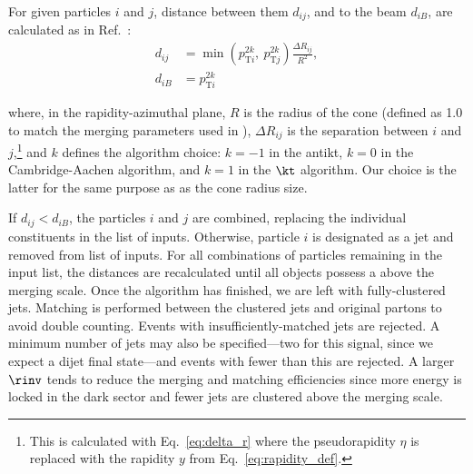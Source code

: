 For given particles $i$ and $j$, distance between them $d_{ij}$, and to the beam $d_{iB}$, are calculated as in Ref.~:
\begin{equation}
    \begin{aligned}
d_{ij} &= \min(p_{\mathrm{T}i}^{2k}, \ p_{\mathrm{T}j}^{2k}) \frac{\Delta R_{ij}}{R^2},\\
d_{iB} &= p_{\mathrm{T}i}^{2k}
    \end{aligned}
    \label{eq:distances_kt_pythia}
\end{equation}

where, in the rapidity-azimuthal plane, $R$ is the radius of the cone (defined as 1.0 to match the merging parameters used in \MADGRAPH), $\Delta R_{ij}$ is the separation between $i$ and $j$,\footnote{This is calculated with Eq.~\ref{eq:delta_r} where the pseudorapidity $\eta$ is replaced with the rapidity $y$ from Eq.~\ref{eq:rapidity_def}.} and $k$ defines the algorithm choice: $k = -\text{1}$ in the \gls{antikt}, $k = \text{0}$ in the Cambridge-Aachen algorithm, and $k = \text{1}$ in the $\kt$ algorithm. Our choice is the latter for the same purpose as as the cone radius size.

If $d_{ij} < d_{iB}$, the particles $i$ and $j$ are combined, replacing the individual constituents in the list of inputs. Otherwise, particle $i$ is designated as a jet and removed from list of inputs. For all combinations of particles remaining in the input list, the distances are recalculated until all objects possess a \pt above the merging scale. Once the algorithm has finished, we are left with fully-clustered \glspl{jet}. Matching is performed between the clustered jets and original partons to avoid double counting. Events with insufficiently-matched jets are rejected. A minimum number of \glspl{jet} may also be specified---two for this signal, since we expect a dijet final state---and events with fewer than this are rejected. A larger $\rinv$ tends to reduce the merging and matching efficiencies since more energy is locked in the dark sector and fewer jets are clustered above the merging scale.




